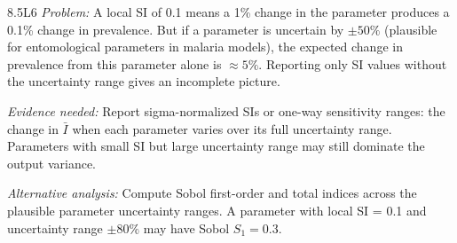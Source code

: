\begin{solution}{8.5}{L6}
\textit{Problem:} A local SI of 0.1 means a 1\% change in the parameter
produces a 0.1\% change in prevalence. But if a parameter is uncertain
by $\pm50\%$ (plausible for entomological parameters in malaria models),
the expected change in prevalence from this parameter alone is $\approx 5\%$.
Reporting only SI values without the uncertainty range gives an incomplete
picture.

\textit{Evidence needed:} Report sigma-normalized SIs or one-way sensitivity
ranges: the change in $\bar{I}$ when each parameter varies over its full
uncertainty range. Parameters with small SI but large uncertainty range
may still dominate the output variance.

\textit{Alternative analysis:} Compute Sobol first-order and total indices
across the plausible parameter uncertainty ranges. A parameter with local
SI = 0.1 and uncertainty range $\pm80\%$ may have Sobol $S_1 = 0.3$.


\end{solution}


